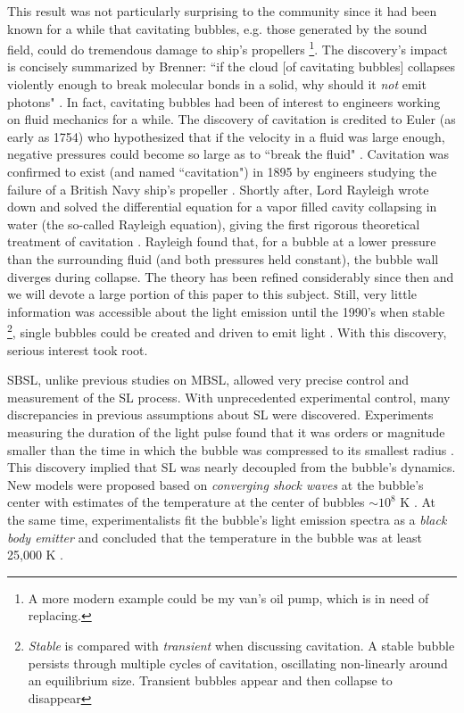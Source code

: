 \documentclass[rmp,aps,nofootinbib,superscriptaddress,floatfix]{revtex4-2}
\begin{document}
This result was not particularly surprising to the community since it had been known for a while that cavitating bubbles, e.g. those generated by the sound field, could do tremendous damage to ship's propellers \footnote{A more modern example could be my van's oil pump, which is in need of replacing.}. The discovery's impact is concisely summarized by Brenner: ``if the cloud [of cavitating bubbles] collapses violently enough to break molecular bonds in a solid, why should it \emph{not} emit photons" \cite{brenner2002single}. In fact, cavitating bubbles had been of interest to engineers working on fluid mechanics for a while. The discovery of cavitation is credited to Euler (as early as 1754) who hypothesized that if the velocity in a fluid was large enough, negative pressures could become so large as to ``break the fluid" \cite{li2015introduction,gaitan1992sonoluminescence}. Cavitation was confirmed to exist (and named ``cavitation") in 1895 by engineers studying the failure of a British Navy ship's propeller \cite{li2015introduction}. Shortly after, Lord Rayleigh wrote down and solved the differential equation for a vapor filled cavity collapsing in water (the so-called Rayleigh equation), giving the first rigorous theoretical treatment of cavitation \cite{rayleigh1917pressure,plesset1977bubble}. Rayleigh found that, for a bubble at a lower pressure than the surrounding fluid (and both pressures held constant), the bubble wall diverges during collapse. The theory has been refined considerably since then \cite{prosperetti1999old,plesset1977bubble,plesset1977bubble,brenner2002single,lofstedt1995sonoluminescing,barber1992resolving} and we will devote a large portion of this paper to this subject. Still, very little information was accessible about the light emission until the 1990's when stable \footnote{\emph{Stable} is compared with \emph{transient} when discussing cavitation. A stable bubble persists through multiple cycles of cavitation, oscillating non-linearly around an equilibrium size. Transient bubbles appear and then collapse to disappear}, single bubbles could be created and driven to emit light \cite{gaitan1990experimental,gaitan1992sonoluminescence,crum1994sonoluminescence}. With this discovery, serious interest took root. 

SBSL, unlike previous studies on MBSL, allowed very precise control and measurement of the SL process. With unprecedented experimental control, many discrepancies in previous assumptions about SL were discovered. Experiments measuring the duration of the light pulse found that it was orders or magnitude smaller than the time in which the bubble was compressed to its smallest radius \cite{barber1992resolving,barber1991observation}. This discovery implied that SL was nearly decoupled from the bubble's dynamics. New models were proposed based on \emph{converging shock waves} at the bubble's center with estimates of the temperature at the center of bubbles $\sim10^8$ K \cite{wu1993shock,greenspan1993sonoluminescence}. At the same time, experimentalists fit the bubble's light emission spectra as a \emph{black body emitter} and concluded that the temperature in the bubble was at least 25,000 K \cite{hiller1992spectrum}. 
\end{document}

